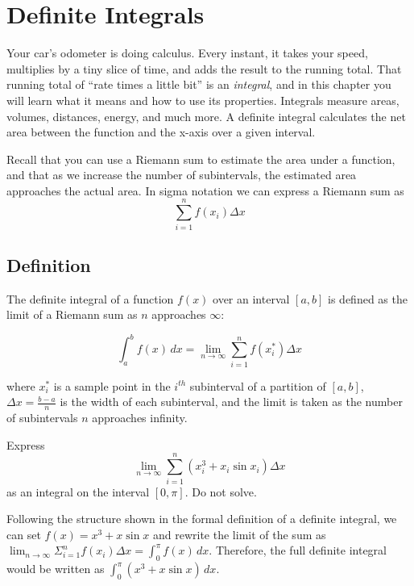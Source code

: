 \chapter{Definite Integrals}
Your car's odometer is doing calculus. Every instant, it takes your
speed, multiplies by a tiny slice of time, and adds the result to the
running total. That running total of ``rate times a little bit'' is an
\emph{integral}, and in this chapter you will learn what it means and how
to use its properties. Integrals measure areas, volumes, distances,
energy, and much more. A definite integral
calculates the net area between the function and the x-axis over a
given interval.

Recall that you can use a Riemann sum to estimate the area under a 
function, and that as we increase the number of subintervals, the 
estimated area approaches the actual area. In sigma notation we can 
express a Riemann sum as 
\begin{equation}
	\sum_{i=1}^{n} f(x_i)\Delta x
	\label{eq:sigmaRiemannSum}
\end{equation}

\section{Definition}
The definite integral of a function $f(x)$ over an interval $[a, b]$
is defined as the limit of a Riemann sum as $n$ approaches $\infty$:

\begin{equation}
\int_{a}^{b} f(x) \, dx = \lim_{{n \to \infty}} \sum_{i=1}^{n} 
f(x_i^*) \Delta x
\end{equation}

where $x_i^*$ is a sample point in the $i^{th}$ subinterval of a
partition of $[a, b]$, $\Delta x = \frac{b-a}{n}$ is the width of each
subinterval, and the limit is taken as the number of subintervals $n$
approaches infinity.

\begin{Exercise}[label=defint1]
Express $$\lim_{n \to \infty} \sum_{i=1}^{n} (x_i^3 + x_i\sin{x_i})
\Delta x$$ as an integral on the interval $[0, \pi]$. Do not solve.
\end{Exercise}

\begin{Answer}[ref=defint1]
Following the structure shown in the formal definition of a definite 
integral, we can set $f(x) = x^3 + x\sin{x}$ and rewrite the limit of 
the sum as $\lim_{n \to \infty} \Sigma_{i=1}^{n} f(x_i)\Delta x = 
\int_{0}^{\pi} f(x)\,dx$. Therefore, the full definite integral 
would be written as $\int_{0}^{\pi} (x^3 + x\sin{x})\, dx$. 
\end{Answer}

